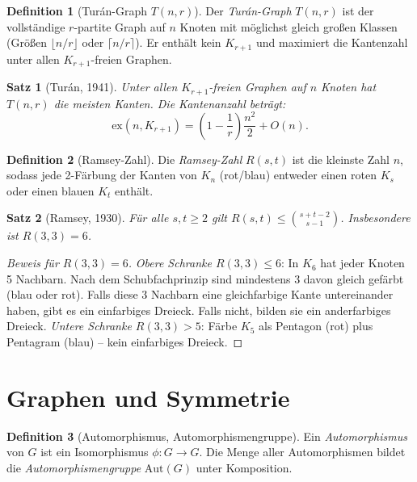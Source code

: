 ﻿\documentclass[a4paper,12pt,openany,oneside]{book}
\theoremstyle{definition}
\newtheorem{definition}{Definition}[chapter]
\theoremstyle{plain}
\newtheorem{satz}{Satz}[chapter]
\theoremstyle{remark}
\begin{document}
\begin{definition}[Tur\'an-Graph $T(n,r)$]
  Der \emph{Tur\'an-Graph} $T(n,r)$ ist der vollst\"andige $r$-partite
  Graph auf $n$ Knoten mit m\"oglichst gleich gro\ss{}en Klassen
  (Gr\"o\ss{}en $\lfloor n/r \rfloor$ oder $\lceil n/r \rceil$).
  Er enth\"alt kein $K_{r+1}$ und maximiert die Kantenzahl unter allen
  $K_{r+1}$-freien Graphen.
\end{definition}

\begin{satz}[Tur\'an, 1941]
  Unter allen $K_{r+1}$-freien Graphen auf $n$ Knoten hat $T(n,r)$ die
  meisten Kanten. Die Kantenanzahl betr\"agt:
  \[
    \mathrm{ex}(n, K_{r+1}) = \left(1 - \frac{1}{r}\right)\frac{n^2}{2}
    + O(n).
  \]
\end{satz}

\begin{definition}[Ramsey-Zahl]
  Die \emph{Ramsey-Zahl} $R(s,t)$ ist die kleinste Zahl $n$, sodass jede
  2-F\"arbung der Kanten von $K_n$ (rot/blau) entweder einen roten $K_s$
  oder einen blauen $K_t$ enth\"alt.
\end{definition}

\begin{satz}[Ramsey, 1930]
  F\"ur alle $s, t \geq 2$ gilt $R(s,t) \leq \binom{s+t-2}{s-1}$.
  Insbesondere ist $R(3,3) = 6$.
\end{satz}

\begin{proof}[Beweis f\"ur $R(3,3)=6$]
  \emph{Obere Schranke $R(3,3) \leq 6$}: In $K_6$ hat jeder Knoten 5
  Nachbarn. Nach dem Schubfachprinzip sind mindestens 3 davon gleich
  gef\"arbt (blau oder rot). Falls diese 3 Nachbarn eine gleichfarbige
  Kante untereinander haben, gibt es ein einfarbiges Dreieck. Falls nicht,
  bilden sie ein anderfarbiges Dreieck.
  \emph{Untere Schranke $R(3,3) > 5$}: F\"arbe $K_5$ als Pentagon (rot)
  plus Pentagram (blau) -- kein einfarbiges Dreieck.
\end{proof}

\section{Graphen und Symmetrie}

\begin{definition}[Automorphismus, Automorphismengruppe]
  Ein \emph{Automorphismus} von $G$ ist ein Isomorphismus $\phi: G \to G$.
  Die Menge aller Automorphismen bildet die
  \emph{Automorphismengruppe} $\mathrm{Aut}(G)$ unter Komposition.
\end{definition}
\end{document}

